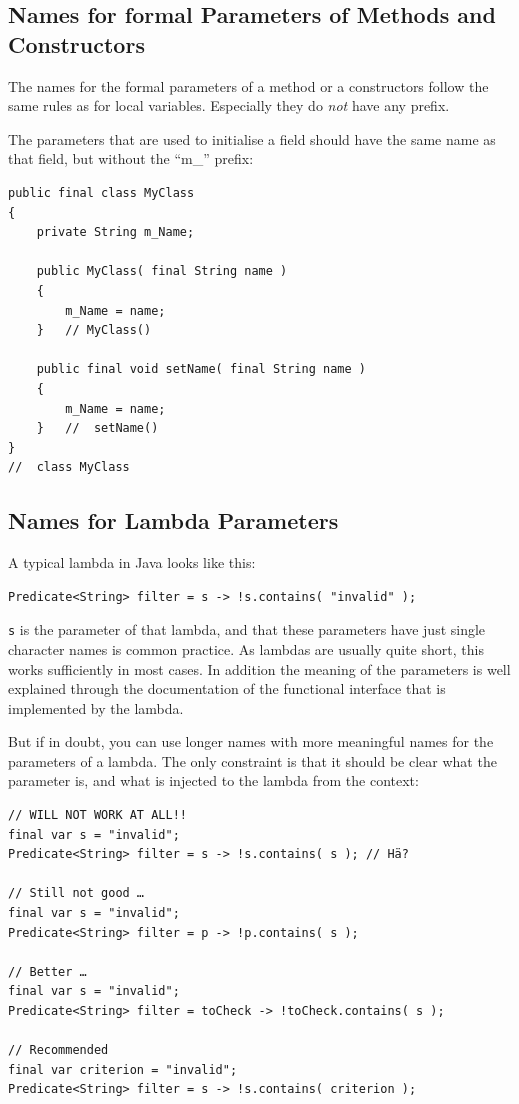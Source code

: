 \documentclass[12pt,a4paper,titlepage, parskip=half, headsepline, footsepline, cleardoubleplain]{scrbook}
\begin{document}
\subsection{Names for formal Parameters of Methods and Constructors}\label{sec:NamesForFormalParameters}
The names for the formal parameters of a method or a constructors follow the same rules as for local variables. Especially they do \textit{not} have any prefix.

The parameters that are used to initialise a field should have the same name as that field, but without the “m\_” prefix:
\begin{lstlisting}
public final class MyClass
{
    private String m_Name;
    
    public MyClass( final String name )
    {
        m_Name = name;
    }   // MyClass()
    
    public final void setName( final String name )
    {
        m_Name = name;
    }   //  setName()
}
//  class MyClass
\end{lstlisting}

\subsection{Names for Lambda Parameters}\label{sec:NamesForLambdaParameters}
A typical lambda in Java looks like this:
\begin{lstlisting}
Predicate<String> filter = s -> !s.contains( "invalid" );
\end{lstlisting}
\lstinline|s| is the parameter of that lambda, and that these parameters have just single character names is common practice. As lambdas are usually quite short, this works sufficiently in most cases. In addition the meaning of the parameters is well explained through the documentation of the functional interface that is implemented by the lambda.

But if in doubt, you can use longer names with more meaningful names for the parameters of a lambda. The only constraint is that it should be clear what the parameter is, and what is injected to the lambda from the context:
\begin{lstlisting}
// WILL NOT WORK AT ALL!!
final var s = "invalid";
Predicate<String> filter = s -> !s.contains( s ); // Hä?

// Still not good …
final var s = "invalid";
Predicate<String> filter = p -> !p.contains( s );

// Better …
final var s = "invalid";
Predicate<String> filter = toCheck -> !toCheck.contains( s );

// Recommended
final var criterion = "invalid";
Predicate<String> filter = s -> !s.contains( criterion );
\end{lstlisting}
\end{document}
